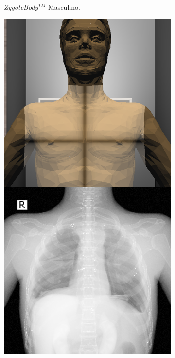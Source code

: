 \begin{figure}[h]
\begin{subfigure}[b]{0.24\linewidth}
        \caption{\emph{ZygoteBody}$^{TM}$ Masculino.}
    \end{subfigure}
     \begin{subfigure}[b]{0.24\linewidth}
        \centering
        {\includegraphics[width=\linewidth]{IMG/anaex.png}}

\end{subfigure}
\end{figure}
